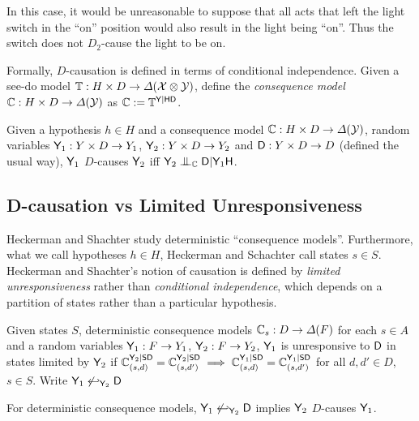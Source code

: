In this case, it would be unreasonable to suppose that all acts that left the light switch in the ``on'' position would also result in the light being ``on''. Thus the switch does not $D_2$-cause the light to be on.

Formally, $D$-causation is defined in terms of conditional independence. Given a see-do model $\mathbb{T}:H\times D\to \Delta(\mathcal{X}\otimes\mathcal{Y})$, define the \emph{consequence model} $\mathbb{C}:H\times D\to \Delta(\mathcal{Y})$ as $\mathbb{C}:=\mathbb{T}^{\mathsf{Y}|\mathsf{H}\mathsf{D}}$.

\begin{definition}[$D$-causation]\label{def:d_cause}
Given a hypothesis $h\in H$ and a consequence model $\mathbb{C}:H\times D\to \Delta(\mathcal{Y})$, random variables $\mathsf{Y}_1:Y\times D\to Y_1$, $\mathsf{Y}_2:Y\times D\to Y_2$ and $\mathsf{D}:Y\times D\to D$ (defined the usual way), $\mathsf{Y}_1$ $D$-causes $\mathsf{Y}_2$ iff $\RV{Y}_2\CI_{\kernel{C}} \RV{D}|\RV{Y}_1\RV{H}$.
\end{definition}

\subsection{D-causation vs Limited Unresponsiveness}

Heckerman and Shachter study deterministic ``consequence models''. Furthermore, what we call hypotheses $h\in H$, Heckerman and Schachter call states $s\in S$. Heckerman and Shachter's notion of causation is defined by \emph{limited unresponsiveness} rather than \emph{conditional independence}, which depends on a partition of states rather than a particular hypothesis.

\begin{definition}
    Given states $S$, deterministic consequence models $\mathbb{C}_s:D\to \Delta(F)$ for each $s\in A$ and a random variables $\mathsf{Y}_1:F\to Y_1$, $\mathsf{Y}_2:F\to Y_2$, $\mathsf{Y}_1$ is unresponsive to $\mathsf{D}$ in states limited by $\mathsf{Y}_2$ if $\mathbb{C}_{(s,d)}^{\mathsf{Y}_2|\mathsf{S}\mathsf{D}}=\mathbb{C}_{(s,d')}^{\mathsf{Y}_2|\mathsf{S}\mathsf{D}}\implies \mathbb{C}_{(s,d)}^{\mathsf{Y}_1|\mathsf{S}\mathsf{D}}=\mathbb{C}_{(s,d')}^{\mathsf{Y}_1|\mathsf{S}\mathsf{D}}$ for all $d,d'\in D$, $s\in S$. Write $\mathsf{Y}_1\not\hookleftarrow_{\mathsf{Y}_2} \mathsf{D}$
\end{definition}

\begin{lemma}
For deterministic consequence models, $\mathsf{Y}_1\not\hookleftarrow_{\mathsf{Y}_2} \mathsf{D} $ implies $\mathsf{Y}_2$ $D$-causes $\mathsf{Y}_1$.
\end{lemma}

